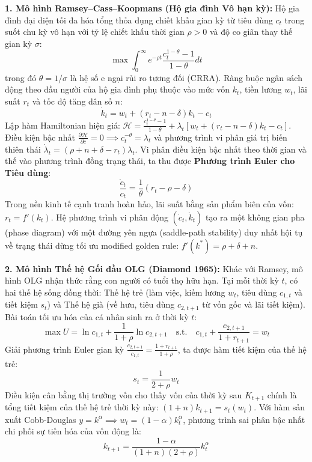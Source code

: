 \documentclass[
]{article}
\begin{document}
\textbf{1. Mô hình Ramsey--Cass--Koopmans (Hộ gia đình Vô hạn kỳ):} Hộ
gia đình đại diện tối đa hóa tổng thỏa dụng chiết khấu gian kỳ từ tiêu
dùng \(c_t\) trong suốt chu kỳ vô hạn với tỷ lệ chiết khấu thời gian
\(\rho > 0\) và độ co giãn thay thế gian kỳ \(\sigma\):
\[\max \int_0^\infty e^{-\rho t} \frac{c_t^{1 - \theta} - 1}{1 - \theta} dt\]
trong đó \(\theta = 1/\sigma\) là hệ số e ngại rủi ro tương đối (CRRA).
Ràng buộc ngân sách động theo đầu người của hộ gia đình phụ thuộc vào
mức vốn \(k_t\), tiền lương \(w_t\), lãi suất \(r_t\) và tốc độ tăng dân
số \(n\): \[\dot{k}_t = w_t + (r_t - n - \delta)k_t - c_t\] Lập hàm
Hamiltonian hiện giá:
\(\mathcal{H} = \frac{c_t^{1-\theta}-1}{1-\theta} + \lambda_t [w_t + (r_t - n - \delta)k_t - c_t]\).
Điều kiện bậc nhất
\(\frac{\partial \mathcal{H}}{\partial c} = 0 \implies c_t^{-\theta} = \lambda_t\)
và phương trình vi phân giá trị biến thiên thái
\(\dot{\lambda}_t = (\rho + n + \delta - r_t)\lambda_t\). Vi phân điều
kiện bậc nhất theo thời gian và thế vào phương trình đồng trạng thái, ta
thu được \textbf{Phương trình Euler cho Tiêu dùng}:
\[\frac{\dot{c}_t}{c_t} = \frac{1}{\theta} (r_t - \rho - \delta)\] Trong
nền kinh tế cạnh tranh hoàn hảo, lãi suất bằng sản phẩm biên của vốn:
\(r_t = f'(k_t)\). Hệ phương trình vi phân động
\((\dot{c}_t, \dot{k}_t)\) tạo ra một không gian pha (phase diagram) với
một đường yên ngựa (saddle-path stability) duy nhất hội tụ về trạng thái
dừng tối ưu modified golden rule: \(f'(k^*) = \rho + \delta + n\).

\textbf{2. Mô hình Thế hệ Gối đầu OLG (Diamond 1965):} Khác với Ramsey,
mô hình OLG nhận thức rằng con người có tuổi thọ hữu hạn. Tại mỗi thời
kỳ \(t\), có hai thế hệ sống đồng thời: Thế hệ trẻ (làm việc, kiếm lương
\(w_t\), tiêu dùng \(c_{1,t}\) và tiết kiệm \(s_t\)) và Thế hệ già (về
hưu, tiêu dùng \(c_{2,t+1}\) từ vốn gốc và lãi tiết kiệm). Bài toán tối
ưu hóa của cá nhân sinh ra ở thời kỳ \(t\):
\[\max U = \ln c_{1,t} + \frac{1}{1+\rho} \ln c_{2,t+1} \quad \text{s.t.} \quad c_{1,t} + \frac{c_{2,t+1}}{1+r_{t+1}} = w_t\]
Giải phương trình Euler gian kỳ
\(\frac{c_{2,t+1}}{c_{1,t}} = \frac{1+r_{t+1}}{1+\rho}\), ta được hàm
tiết kiệm của thế hệ trẻ: \[s_t = \frac{1}{2 + \rho} w_t\] Điều kiện cân
bằng thị trường vốn cho thấy vốn của thời kỳ sau \(K_{t+1}\) chính là
tổng tiết kiệm của thế hệ trẻ thời kỳ này: \((1+n) k_{t+1} = s_t(w_t)\).
Với hàm sản xuất Cobb-Douglas
\(y = k^\alpha \implies w_t = (1-\alpha)k_t^\alpha\), phương trình sai
phân bậc nhất chi phối sự tiến hóa của vốn động là:
\[k_{t+1} = \frac{1-\alpha}{(1+n)(2+\rho)} k_t^\alpha\]
\end{document}
